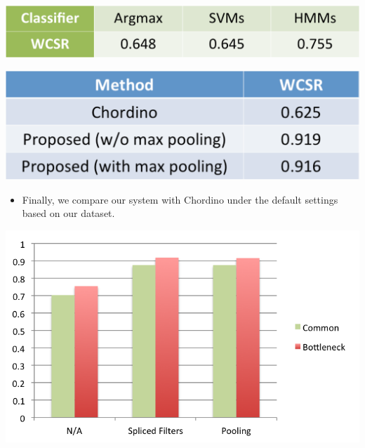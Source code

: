 \documentclass[landscape,archE1,fontscale=0.315]{baposter} %
\newcommand{\compresslist}{ %
\setlength{\itemsep}{1pt}
\setlength{\parskip}{0pt}
\setlength{\parsep}{0pt}
}
\begin{document}
\begin{poster}
{\begin{multicols}{2}
\begin{itemize}
\end{itemize}

\begin{center}
\includegraphics[width=0.8\linewidth]{post-classifier}
\end{center}

\begin{center}
\includegraphics[width=0.8\linewidth]{final}
\end{center}


 
\begin{itemize}\compresslist
\item Finally, we compare our system with
Chordino\cite{mauch2010approximate} under the default settings based on our
dataset.
\end{itemize}
\begin{center}
\includegraphics[width=1\linewidth]{architecture}
\end{center}




\end{multicols}}
\end{poster}
\end{document}
